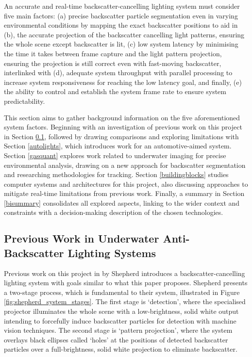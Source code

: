An accurate and real-time backscatter-cancelling lighting system must consider five main factors: (a) precise backscatter particle segmentation even in varying environmental conditions by mapping the exact backscatter positions to aid in (b), the accurate projection of the backscatter cancelling light patterns, ensuring the whole scene except backscatter is lit, (c) low system latency by minimising the time it takes between frame capture and the light pattern projection, ensuring the projection is still correct even with fast-moving backscatter, interlinked with (d), adequate system throughput with parallel processing to increase system responsiveness for reaching the low latency goal, and finally, (e) the ability to control and establish the system frame rate to ensure system predictability.

This section aims to gather background information on the five aforementioned system factors. Beginning with an investigation of previous work on this project in Section \ref{prevwork}, followed by drawing comparisons and exploring limitations with Section \ref{autolights}, which introduces work for an automotive-aimed system. Section \ref{gasquant} explores work related to underwater imaging for precise environmental analysis, drawing on a new approach for backscatter segmentation and researching methodologies for tracking. Section \ref{buildingblocks} studies computer systems and architectures for this project, also discussing approaches to mitigate real-time limitations from previous work. Finally, a summary in Section \ref{bisummary} consolidates all explored aspects, linking to the wider context and constraints with a decision-making description of the chosen technologies.

\subsection{Previous Work in Underwater Anti-Backscatter Lighting Systems}
\label{prevwork}

Previous work on this project in \cite{katieshepherdMachineVisionBased2023} by Shepherd introduces a backscatter-cancelling lighting system with goals similar to what this paper proposes. Shepherd presents a two-stage process, which is fundamental to their system, illustrated in Figure \ref{fig:shepherd_system_stages}. The first stage is `detection', where the specialised projector illuminates the whole scene with a low-brightness, solid white output intending to forcefully induce backscatter particles for detection with machine vision techniques. The second stage is `pattern projection', where the system overlays black ellipses called `holes' at the positions of detected backscatter particles over a full-brightness, solid white projection to eliminate backscatter.

